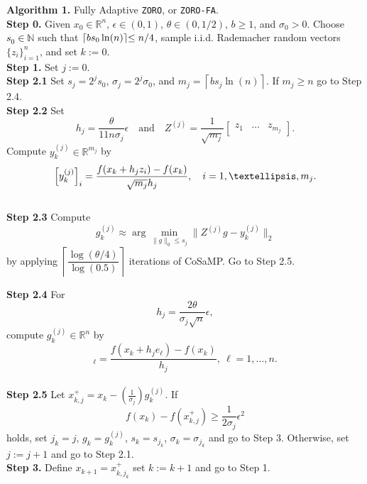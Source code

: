 \begin{mdframed}
\noindent\textbf{Algorithm 1.} Fully Adaptive {\tt ZORO}, or {\tt ZORO-FA}. 
\\[0.2cm]
\textbf{Step 0.} Given $x_{0}\in\mathbb{R}^{n}$, $\epsilon\in (0,1)$, $\theta\in (0,1/2)$, $b \geq 1$, and $\sigma_{0}>0$. Choose \textcolor{black}{$s_{0}\in\mathbb{N}$} such that $\lceil b s_{0}\ln(n)\rceil\textcolor{black}{\leq n/4}$, sample i.i.d. Rademacher random vectors $\{z_i\}_{i=1}^n$, and set $k:=0$.
\\[0.2cm]
\textbf{Step 1.} Set $j:=0$.
\\[0.2cm]
\textbf{Step 2.1} Set $s_j = 2^js_0$, $\sigma_j = 2^j\sigma_0$, and $m_{j}=\left\lceil bs_{j}\ln(n)\right\rceil$. If $m_{j}\geq n$ go to Step 2.4.
\\[0.2cm]
\noindent\textbf{Step 2.2} Set
\begin{equation*}
    h_{j}=\dfrac{\theta}{11 n \sigma_{j}}\epsilon\quad\text{and}\quad Z^{(j)} = \frac{1}{\sqrt{m_j}} \begin{bmatrix} z_1 & \ldots & z_{m_j} \end{bmatrix}.
\end{equation*}
Compute $y_k^{(j)}\in\mathbb{R}^{m_{j}}$ by
\begin{equation*}
\textcolor{black}{\left[y^{(j)}_{k}\right]_{i}=\dfrac{f(x_{k}+h_{j}z_{i})-f(x_{k})}{\sqrt{m_j}h_{j}},\quad i=1,\ldots,m_{j}}.
\end{equation*}
\\[0.2cm]
\noindent\textbf{Step 2.3} Compute
\begin{equation*}
    g_{k}^{(j)}\approx \arg\min_{\|g\|_{0}\leq s_{j}}\|Z^{(j)}g-y^{(j)}_{k}\|_{2}
\end{equation*}
by applying $\left\lceil\dfrac{\log\left(\theta/4\right)}{\log(0.5)}\right\rceil$ iterations of CoSaMP. Go to Step 2.5.

\noindent\textbf{Step 2.4} For 
\begin{equation*}
    h_j = \frac{2\theta}{\sigma_j\sqrt{n}}\epsilon,
\end{equation*}
compute $g_k^{(j)} \in \mathbb{R}^n$ by 
\begin{equation*}
    [g_k^{(j)}]_{\ell} = \frac{f(x_k + h_je_{\ell}) - f(x_k)}{h_j}, \ \ell = 1,\ldots, n.
\end{equation*}
\\[0.2cm]
\noindent\textbf{Step 2.5} Let $x_{k,j}^{+}=x_{k}-\left(\frac{1}{\sigma_{j}}\right)g_{k}^{(j)}$. If 
\begin{equation}
    f(x_{k})-f(x_{k,j}^{+})\geq\dfrac{1}{2\sigma_{j}}\epsilon^{2}
    \label{eq:decrease}
\end{equation}
holds, set $j_{k}=j$, $g_{k}=g_{k}^{(j)}$, $s_{k}=s_{j_{k}}$, $\sigma_{k}=\sigma_{j_{k}}$ and go to Step 3. Otherwise, set $j:=j+1$ and go to Step 2.1.
\\[0.2cm]
\noindent\textbf{Step 3.} Define $x_{k+1}=x_{k,j_{k}}^{+}$ set $k:=k+1$ and go to Step 1.
\end{mdframed}
